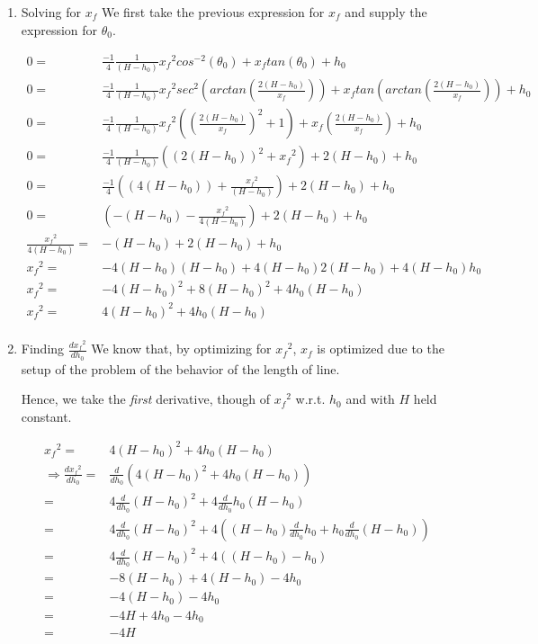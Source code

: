 \documentclass[11pt]{article}
\begin{document}
\begin{enumerate}
\item Solving for \(x_f\)
\label{sec:org3f37b9a}
We first take the previous expression for \(x_f\) and supply the expression for \(\theta_0\).

\begin{align}
    0 =& \frac{-1}{4} \frac{1}{(H-h_0)}{x_f}^2cos^{-2}(\theta_0) + x_f tan(\theta_0) + h_0  \\
    0 =& \frac{-1}{4} \frac{1}{(H-h_0)}{x_f}^2sec^{2}(arctan(\frac{2(H-h_0)}{x_f})) + x_f tan(arctan(\frac{2(H-h_0)}{x_f})) + h_0  \\
    0 =& \frac{-1}{4} \frac{1}{(H-h_0)}{x_f}^2((\frac{2(H-h_0)}{x_f})^2 +1) + x_f (\frac{2(H-h_0)}{x_f}) + h_0  \\
    0 =& \frac{-1}{4} \frac{1}{(H-h_0)} ((2(H-h_0))^2 + {x_f}^2) + 2(H-h_0) + h_0  \\
    0 =& \frac{-1}{4} ((4(H-h_0)) + \frac{{x_f}^2}{(H-h_0)}) + 2(H-h_0) + h_0  \\
    0 =& (-(H-h_0) - \frac{{x_f}^2}{4(H-h_0)}) + 2(H-h_0) + h_0  \\
    \frac{{x_f}^2}{4(H-h_0)} =& -(H-h_0) + 2(H-h_0) + h_0  \\
    {x_f}^2 =& -4(H-h_0)(H-h_0) + {4(H-h_0)}2(H-h_0) + {4(H-h_0)}h_0  \\
    {x_f}^2 =& -4(H-h_0)^2 + 8(H-h_0)^2 + 4h_0(H-h_0)  \\
    {x_f}^2 =& 4(H-h_0)^2 + 4h_0(H-h_0)  \\
\end{align}

\item Finding \(\frac{d{x_f}^2}{dh_0}\)
\label{sec:orgf4fff73}
We know that, by optimizing for \({x_f}^2\), \(x_f\) is optimized due to the setup of the problem of the behavior of the length of line.

Hence, we take the \emph{first} derivative, though of \({x_f}^2\) w.r.t. \(h_0\) and with \(H\) held constant.

\begin{align}
    {x_f}^2 =& 4(H-h_0)^2 + 4h_0(H-h_0) \\
\Rightarrow \frac{d{x_f}^2}{d h_0} =& \frac{d}{d h_0} (4(H-h_0)^2 + 4h_0(H-h_0)) \\
=& 4\frac{d}{d h_0} (H-h_0)^2 + 4\frac{d}{d h_0} h_0(H-h_0) \\
=& 4\frac{d}{d h_0} (H-h_0)^2 + 4((H-h_0) \frac{d}{d h_0} h_0 + h_0 \frac{d}{d h_0} (H-h_0) ) \\
=& 4\frac{d}{d h_0} (H-h_0)^2 + 4((H-h_0) - h_0) \\
=& -8(H-h_0) + 4(H-h_0) - 4h_0\\
=& -4(H-h_0) - 4h_0\\
=& -4H + 4h_0 - 4h_0\\
=& -4H
\end{align}


\end{enumerate}
\end{document}
